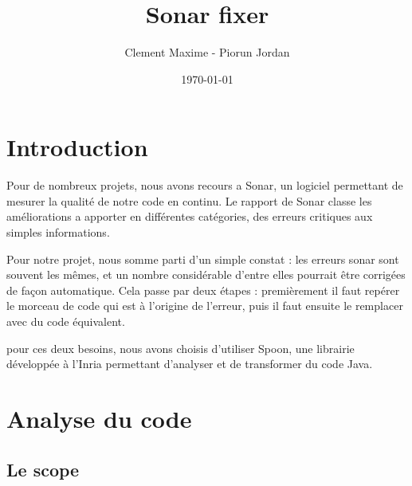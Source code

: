 \documentclass[a4paper]{article}
\begin{document}
\clearpage
\vspace*{\fill}
\begin{center}
\begin{minipage}{.6\textwidth}
\title{Sonar fixer}
\author{Clement Maxime - Piorun Jordan}
\date{\today}
\maketitle
\end{minipage}

\end{center}
\vfill %
\clearpage

\newpage

\section{Introduction}
\par Pour de nombreux projets, nous avons recours a Sonar, un logiciel permettant de mesurer la qualité de notre code en continu. Le rapport de Sonar classe les améliorations a apporter en différentes catégories, des erreurs critiques aux simples informations.
\\
\par Pour notre projet, nous somme parti d'un simple constat : les erreurs sonar sont souvent les mêmes, et un nombre considérable d'entre elles pourrait être corrigées de façon automatique. Cela passe par deux étapes : premièrement il faut repérer le morceau de code qui est à l'origine de l'erreur, puis il faut ensuite le remplacer avec du code équivalent.
\\
\par pour ces deux besoins, nous avons choisis d'utiliser Spoon, une librairie développée à l'Inria permettant d'analyser et de transformer du code Java.

\newpage
\section{Analyse du code}
\subsection{Le scope}
\end{document}
